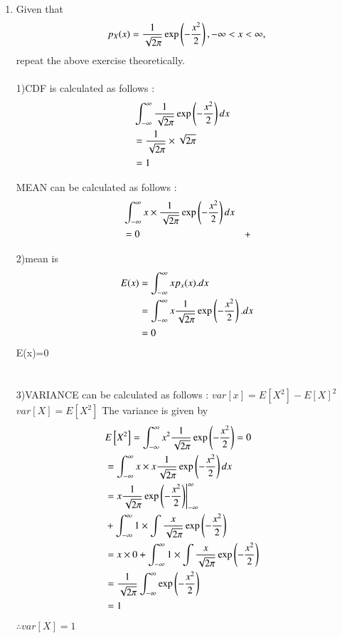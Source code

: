 \documentclass[journal,12pt,twocolumn]{IEEEtran}
\renewcommand\thesection{\arabic{section}}
\begin{document}
\begin{enumerate}[label=\thesection.\arabic*
,ref=\thesection.\theenumi]
\item Given that 
\begin{align}
p_{X}(x) = \frac{1}{\sqrt{2\pi}}\exp\left(-\frac{x^2}{2}\right), -\infty < x < \infty,
\end{align}
repeat the above exercise theoretically.\\
\solution\\ 
1)CDF is calculated as follows :
\begin{align}
 & \int_{-\infty}^{\infty} \frac{1}{\sqrt{2\pi}}\exp\left(-\frac{x^2}{2}\right) dx & \\
    & = \frac{1}{\sqrt{2\pi}} \times \sqrt{2\pi} & \\
     & = 1 &
\end{align}

MEAN can be calculated as follows :
\begin{align}
   & \int_{-\infty}^{\infty} x \times \frac{1}{\sqrt{2\pi}}\exp\left(-\frac{x^2}{2}\right) dx& \\ 
   & = 0 &+
\end{align}
  
  2)mean is 
  \begin{align}
      E(x)&=\int_{-\infty}^{\infty} xp_x(x).dx\\
      &=\int_{-\infty}^{\infty} x\frac{1}{\sqrt{2\pi}}\exp\left(-\frac{x^2}{2}\right).dx\\
      &=0\\
  \end{align}
 E(x)=0\\ \\ \\
 
 3)VARIANCE can be calculated as follows :
 $var[x]=E[X^2]-E[X]^2$\\
 $var[X]=E[X^2]$
The variance is given by
		\begin{align}
		&	E{}\left[X^2\right] = \int_{-\infty}^{\infty}x^2\frac{1}{\sqrt{2\pi}}\exp{\left(-\frac{x^2}{2}\right)} = 0 & \\
		& = \int_{-\infty}^{\infty} x \times x \frac{1}{\sqrt{2\pi}}\exp\left(-\frac{x^2}{2}\right) dx & \\
		& = x\frac{1}{\sqrt{2\pi}}\exp\left(-\frac{x^2}{2}\right)\Biggr|_{-\infty}^{\infty}& \\
 &+\int_{-\infty}^{\infty}1\times\int  \frac{x}{\sqrt{2\pi}}\exp\left(-\frac{x^2}{2}\right)&\\
 & = x \times 0+\int_{-\infty}^{\infty}1 \times \int  \frac{x}{\sqrt{2\pi}}\exp\left(-\frac{x^2}{2}\right) &\\
		&  = \frac{1}{\sqrt{2\pi}}\int_{-\infty}^{\infty} \exp\left(-\frac{x^2}{2}\right) & \\
		& =1\\
		\end{align}
$\therefore var[X]=1$\\
\end{enumerate}
\end{document}
